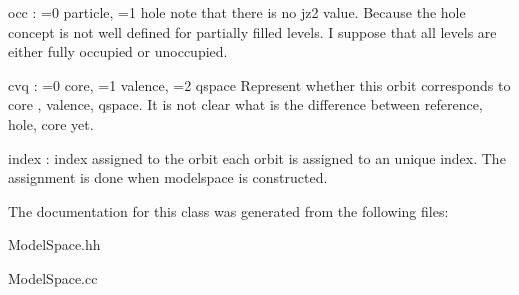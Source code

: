 occ \+: =0 particle, =1 hole note that there is no jz2 value. Because the hole concept is not well defined for partially filled levels. I suppose that all levels are either fully occupied or unoccupied.

cvq \+: =0 core, =1 valence, =2 qspace Represent whether this orbit corresponds to core , valence, qspace. It is not clear what is the difference between reference, hole, core yet.

index \+: index assigned to the orbit each orbit is assigned to an unique index. The assignment is done when modelspace is constructed. 

The documentation for this class was generated from the following files\+:\begin{DoxyCompactItemize}
\item 
Model\+Space.\+hh\item 
Model\+Space.\+cc\end{DoxyCompactItemize}
